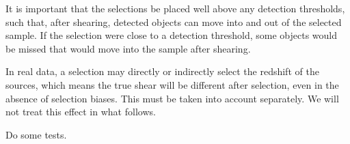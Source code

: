 \documentclass[usegraphicx,usenatbib]{mn2e}
\newcommand{\snr}{$S/N$}
\newcommand{\bdsim}{\texttt{BD}}
\begin{document}
It is important that the selections be placed well above any detection
thresholds, such that, after shearing, detected objects can move into and out
of the selected sample.  If the selection were close to a detection threshold,
some objects would be missed that would move into the sample after shearing.

In real data, a selection may directly or indirectly select the redshift of the
sources, which means the true shear will be different after selection, even
in the absence of selection biases.  This must be taken into account separately. We
will not treat this effect in what follows.

Do some tests.

\end{document}
